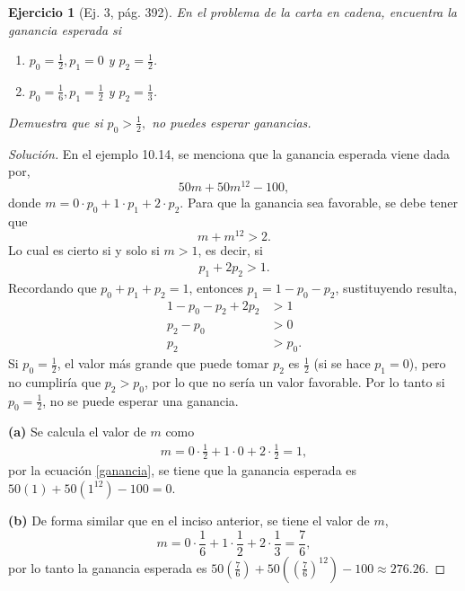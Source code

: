 \documentclass[12pt,letterpaper]{article}
\newtheorem{ej}{Ejercicio}
\begin{document}
\begin{ej}[Ej. 3, pág. 392]
En el problema de la carta en cadena, encuentra la ganancia esperada si
\begin{enumerate}
\item[(a)] $p_0 = \frac{1}{2}, p_1 = 0$ y $p_2 = \frac{1}{2}$.
\item[(b)] $p_0 = \frac{1}{6}, p_1 = \frac{1}{2}$ y $p_2 = \frac{1}{3}$.
\end{enumerate}
Demuestra que si $p_0 > \frac{1}{2},$ no puedes esperar ganancias.
\end{ej}
\begin{proof}[Solución]
En el ejemplo 10.14, se menciona que la ganancia esperada viene dada por,
\begin{equation}
\label{ganancia}
50m + 50m^{12} - 100,
\end{equation} 
donde $m = 0 \cdot p_0 +1\cdot p_1 + 2 \cdot p_2$. Para que la  ganancia sea favorable, se debe tener que 
\begin{equation}
m+m^{12} > 2.
\end{equation}
Lo cual es cierto si y solo si $m>1$, es decir, si
\begin{align}
p_1 + 2p_2 > 1.
\end{align}
Recordando que $p_0 + p_1 + p_2 = 1$, entonces $p_1 = 1-p_0 - p_2$, sustituyendo resulta,
\begin{align}
1-p_0 -p_2 + 2p_2 &>1 \\
p_2 - p_0 &>0 \\
p_2 &>p_0.
\end{align}
Si $p_0 = \frac{1}{2}$, el valor más grande que puede tomar $p_2$ es $\frac{1}{2}$ (si se hace $p_1 =0$), pero no cumpliría que $p_2 > p_0$, por lo que no sería un valor favorable. Por lo tanto si $p_0 = \frac{1}{2}$, no se puede esperar una ganancia.

\textbf{(a)} Se calcula el valor de $m$ como
\begin{align}
m = 0\cdot \frac{1}{2} + 1\cdot 0 + 2\cdot\frac{1}{2}= 1, 
\end{align}
por la ecuación \ref{ganancia}, se tiene que la ganancia esperada es $50(1)+50(1^{12})-100 = 0$.

\textbf{(b)} De forma similar que en el inciso anterior, se tiene el valor de $m$,
\begin{equation}
m = 0 \cdot \frac{1}{6} + 1 \cdot \frac{1}{2} + 2\cdot \frac{1}{3} = \frac{7}{6},
\end{equation}
por lo tanto la ganancia esperada es $50\left(\frac{7}{6}\right)+50\left(\left(\frac{7}{6}\right)^{12}\right)-100 \approx 276.26$.
\end{proof}
\end{document}
